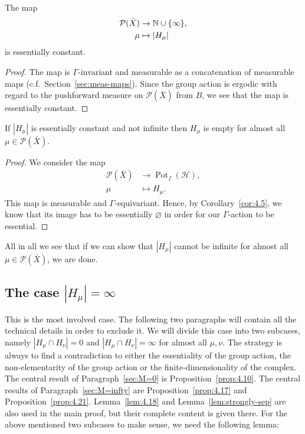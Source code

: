 \begin{lemma}
  \label{lem:h-const}
  The map
  \begin{align*}
    \mathcal{P}(\bar X) &\to \mathbb{N} \cup \{\infty\},\\
    \mu &\mapsto |H_\mu|
  \end{align*}
  is essentially constant.
\end{lemma}

\begin{proof}
  The map is \(\Gamma\)-invariant and measurable as a concatenation of measurable maps (c.f.~Section~\ref{sec:meas-maps}). Since the group action is ergodic with regard to the pushforward measure on \(\mathcal{P}(\bar X)\) from \(B\), we see that the map is essentially constant.
\end{proof}

\begin{lemma}
  \label{lem:finite-zero}
  If \(|H_\mu|\) is essentially constant and not infinite then \(H_\mu\) is empty for almost all \(\mu \in \mathcal{P}(\bar X)\).
\end{lemma}

\begin{proof}
  We consider the map
  \begin{align*}
    \mathcal{P}(\bar X) & \to \operatorname{Pot}_f(\mathcal{H}),\\
    \mu & \mapsto H_\mu.
  \end{align*}
  This map is measurable and \(\Gamma\)-equivariant. Hence, by Corollary~\ref{cor:4.5}, we know that its image has to be essentially \(\varnothing\) in order for our \(\Gamma\)-action to be essential.
\end{proof}

All in all we see that if we can show that \(|H_\mu|\) cannot be infinite for almost all \(\mu \in \mathcal{P}(\bar X)\), we are done. 

\subsection{The case \(|H_\mu| = \infty\)}
\label{sec:N=infty}

This is the most involved case. The following two paragraphs will contain all the technical details in order to exclude it. We will divide this case into two subcases, namely \(|H_\mu \cap H_\nu| = 0\) and \(|H_\mu \cap H_\nu| = \infty\) for almost all \(\mu, \nu\). The strategy is always to find a contradiction to either the essentiality of the group action, the non-elementarity of the group action or the finite-dimensionality of the complex. The central result of Paragraph~\ref{sec:M=0} is Proposition~\ref{prop:4.10}. The central results of Paragraph~\ref{sec:M=infty} are Proposition~\ref{prop:4.17} and Proposition~\ref{prop:4.21}. Lemma~\ref{lem:4.18} and Lemma~\ref{lem:strongly-sep} are also used in the main proof, but their complete content is given there.
For the above mentioned two subcases to make sense, we need the following lemma:

